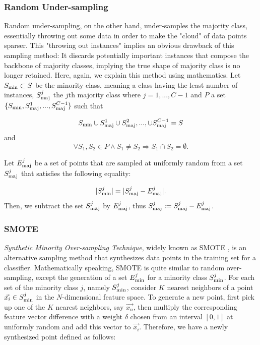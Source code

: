 \documentclass{article}
\begin{document}
	\subsubsection{Random Under-sampling}
	Random under-sampling, on the other hand, under-samples the majority class, essentially throwing out some data in order to make the "cloud" of data points sparser. This "throwing out instances" implies an obvious drawback of this sampling method: It discards potentially important instances that compose the backbone of majority classes, implying the true shape of majority class is no longer retained. Here, again, we explain this method using mathematics. Let $S_{\rm{min}} \subset S$ be the minority class, meaning a class having the least number of instances, $S_{\rm{maj}}^{j}$ the $j$th majority class where $j = 1,...,C-1$ and $P$ a set $\{S_{\rm{min}}, S_{\rm{maj}}^{1},...,S_{\rm{maj}}^{C-1} \}$ such that

	\begin{equation}
	S_{\rm{min}} \cup S_{\rm{maj}}^{1} \cup S_{\rm{maj}}^{2},..., \cup S_{\rm{maj}}^{C-1} = S
	\end{equation}
	and
	\begin{equation}
	\forall S_1,S_2 \in P \land S_1 \neq S_2 \Rightarrow S_1 \cap S_2 = \emptyset.
	\end{equation}
	
Let $E_{\rm{maj}}^j$ be a set of points that are sampled at uniformly random from a set $S_{\rm{maj}}^{j}$ that satisfies the following equality:

	\begin{equation}
	|S_{\rm{min}}^{j}| = | S_{\rm{maj}}^j -  E_{\rm{maj}}^j |.
	\end{equation}
Then, we subtract the set $S_{\rm{maj}}^j$ by $E_{\rm{maj}}^j$, thus $S_{\rm{maj}}^j := S_{\rm{maj}}^j -  E_{\rm{maj}}^j$.
		
		\subsubsection{SMOTE}
		\textit{Synthetic Minority Over-sampling Technique}, widely known as SMOTE \cite{SMOTE}, is an alternative sampling method that synthesizes data points in the training set for a classifier. Mathematically speaking, SMOTE is quite similar to random over-sampling, except the generation of a set $E_{\rm{min}}^j$ for a minority class $S_{\rm{min}}^j$. For each set of the minority class $j$, namely $S_{\rm{min}}^j$, consider $K$ nearest neighbors of a point $\vec{x_i} \in S_{\rm{min}}^j$ in the $N$-dimensional feature space. To generate a new point, first pick up one of the $K$ nearest neighbors, say $\vec{x_{n}}$, then multiply the corresponding feature vector difference with a weight  $\delta$  chosen from an interval $ [0,1]$ at uniformly random and add this vector to $\vec{x_i}$. Therefore, we have a newly synthesized point defined as follows:
		
\end{document}
